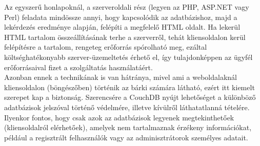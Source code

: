 		Az egyszerű honlapoknál, a szerveroldali rész (legyen az PHP, ASP.NET vagy Perl) feladata mindössze annyi, hogy kapcsolódik az adatbázishoz, majd a lekérdezés eredménye alapján, felépíti a megfelelő HTML oldalt. Ha lekerül HTML tartalom összeállításának terhe a szerverről, tehát kliensoldalon kerül felépítésre a tartalom, rengeteg erőforrás spórolható meg, ezáltal költséghatékonyabb szerver-üzemeltetés érhető el, így tulajdonképpen az ügyfél erőforrásaival fizet a szolgáltatás használatáért.\hfill\\
		Azonban ennek a technikának is van hátránya, mivel ami a weboldalaknál kliensoldalon (böngészőben) történik az bárki számára látható, ezért itt kiemelt szerepet kap a biztonság. Szerencsére a CouchDB nyújt lehetőséget a különböző adatbázisok jelszóval történő védelmére, illetve kívülről láthatatlanná tételére. Ilyenkor fontos, hogy csak azok az adatbázisok legyenek megtekinthetőek (kliensoldalról elérhetőek), amelyek nem tartalmaznak érzékeny információkat, például a regisztrált felhasználók vagy az adminisztrátorok személyes adatait.

		

